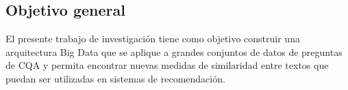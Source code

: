 \subsection{Objetivo general}
\noindent El presente trabajo de investigación tiene como objetivo construir una arquitectura Big Data que se aplique a grandes conjuntos de datos de preguntas de CQA y permita encontrar nuevas medidas de similaridad entre textos que puedan ser utilizadas en sistemas de recomendación.
